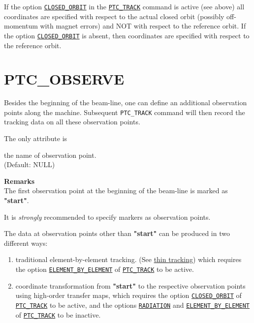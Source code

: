 If the option
\hyperref[opt:closed-orbit]{\texttt{CLOSED\_ORBIT}} in the
\hyperref[sec:ptc-track]{\texttt{PTC\_TRACK}} command is active
(see above) all coordinates are specified with respect to the actual
closed orbit (possibly off-momentum with magnet errors) and NOT with
respect to the reference orbit. 
If the option \hyperref[opt:closed-orbit]{\texttt{CLOSED\_ORBIT}} is absent,
then coordinates are specified with respect to the reference orbit.  

\section{PTC\_OBSERVE} 
\label{sec:ptc-observe}

Besides the beginning of the beam-line, one can define an additional
observation points along the machine. Subsequent \texttt{PTC\_TRACK}
command will then record the tracking data on all these observation
points.  


The only attribute is 
\begin{madlist}
   the name of observation point.  \\ (Default: NULL)
\end{madlist}


\textbf{Remarks}\\
The first observation point at the beginning of the beam-line is marked
as \textbf{"start"}.  
       
It is {\em strongly} recommended to specify markers as observation points.

The data at observation points other than \textbf{"start"} can be produced
in two different ways:
\begin{enumerate}
  \item traditional element-by-element tracking. (See
    \hyperref[chap:thintrack]{\madx thin tracking}) which 
    requires the option
    \hyperref[opt:element-by-element]{\texttt{ELEMENT\_BY\_ELEMENT}} of
    \hyperref[sec:ptc-track]{\texttt{PTC\_TRACK}} to be active. 

  \item coordinate transformation from \textbf{"start"} to the
  respective observation points using high-order \ptc transfer
  maps, which requires the option
  \hyperref[opt:closed-orbit]{\texttt{CLOSED\_ORBIT}} of
  \hyperref[sec:ptc-track]{\texttt{PTC\_TRACK}} to be active, and the
  options \hyperref[opt:radiation]{\texttt{RADIATION}} 
  and \hyperref[opt:element-by-element]{\texttt{ELEMENT\_BY\_ELEMENT}} of
  \hyperref[sec:ptc-track]{\texttt{PTC\_TRACK}} to be inactive.
\end{enumerate} 


